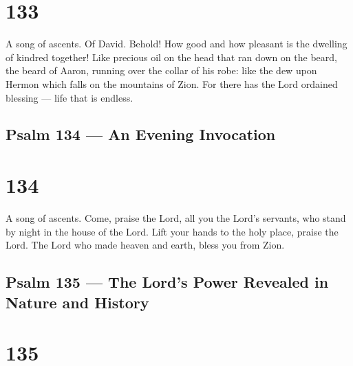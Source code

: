 \hypertarget{section-132}{%
\section{133}\label{section-132}}

A song of ascents. Of David.  Behold! How good and how
pleasant is the dwelling of kindred together!  Like precious
oil on the head that ran down on the beard, the beard of Aaron, running
over the collar of his robe:  like the dew upon Hermon which
falls on the mountains of Zion. For there has the Lord ordained blessing
--- life that is endless.

\hypertarget{psalm-134-an-evening-invocation}{%
\subsection{Psalm 134 --- An Evening
Invocation}\label{psalm-134-an-evening-invocation}}

\hypertarget{section-133}{%
\section{134}\label{section-133}}

A song of ascents.  Come, praise the Lord, all you the
Lord's servants, who stand by night in the house of the Lord.
 Lift your hands to the holy place, praise the Lord.
 The Lord who made heaven and earth, bless you from Zion.

\hypertarget{psalm-135-the-lords-power-revealed-in-nature-and-history}{%
\subsection{Psalm 135 --- The Lord's Power Revealed in Nature and
History}\label{psalm-135-the-lords-power-revealed-in-nature-and-history}}

\hypertarget{section-134}{%
\section{135}\label{section-134}}

